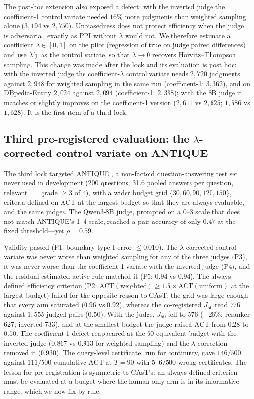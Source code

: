 \documentclass{article}
\newcommand{\ACT}{\mathrm{ACT}}
\newcommand{\Jfifty}{J_{50}}
\begin{document}
The post-hoc extension also exposed a defect: with the inverted judge the coefficient-1 control variate needed $16\%$ more judgments than weighted sampling alone ($3{,}194$ vs $2{,}750$). Unbiasedness does not protect efficiency when the judge is adversarial, exactly as PPI without $\lambda$ would not. We therefore estimate a coefficient $\lambda\in[0,1]$ on the pilot (regression of true on judge paired differences) and use $\lambda\hat\jmath$ as the control variate, so that $\lambda\to0$ recovers Horvitz--Thompson sampling. This change was made after the lock and its evaluation is post hoc: with the inverted judge the coefficient-$\lambda$ control variate needs $2{,}720$ judgments against $2{,}948$ for weighted sampling in the same run (coefficient-1: $3{,}362$), and on DBpedia-Entity $2{,}024$ against $2{,}094$ (coefficient-1: $2{,}388$); with the 8B judge it matches or slightly improves on the coefficient-1 version ($2{,}611$ vs $2{,}625$; $1{,}586$ vs $1{,}628$). It is the first item of a third lock.


\subsection{Third pre-registered evaluation: the $\lambda$-corrected control variate on ANTIQUE}
The third lock targeted ANTIQUE \citep{hashemi2020antique}, a non-factoid question-answering test set never used in development (200 questions, 31.6 pooled answers per question, relevant $=$ grade $\ge3$ of 4), with a wider budget grid $\{30,60,90,120,150\}$, criteria defined on $\ACT$ at the largest budget so that they are always evaluable, and the same judges. The Qwen3-8B judge, prompted on a 0--3 scale that does not match ANTIQUE's 1--4 scale, reached a pair accuracy of only $0.47$ at the fixed threshold---yet $\rho=0.59$.

Validity passed (P1: boundary type-I error $\le0.010$). The $\lambda$-corrected control variate was never worse than weighted sampling for any of the three judges (P3), it was never worse than the coefficient-1 variate with the inverted judge (P4), and the residual-estimated active rule matched it (P5: $0.94$ vs $0.94$). The always-defined efficiency criterion (P2: $\ACT(\text{weighted})\ge1.5\times\ACT(\text{uniform})$ at the largest budget) failed for the opposite reason to CAsT: the grid was large enough that every arm saturated ($0.96$ vs $0.92$), whereas the co-registered $\Jfifty$ read $776$ against $1{,}555$ judged pairs ($0.50$). With the judge, $\Jfifty$ fell to $576$ ($-26\%$; reranker $627$; inverted $733$), and at the smallest budget the judge raised $\ACT$ from $0.28$ to $0.50$. The coefficient-1 defect reappeared at the 60-equivalent budget with the inverted judge ($0.867$ vs $0.913$ for weighted sampling) and the $\lambda$ correction removed it ($0.930$). The query-level certificate, run for continuity, gave $146/500$ against $111/500$ cumulative $\ACT$ at $T=90$ with $5$--$6/500$ wrong certificates. The lesson for pre-registration is symmetric to CAsT's: an always-defined criterion must be evaluated at a budget where the human-only arm is in its informative range, which we now fix by rule.
\end{document}
